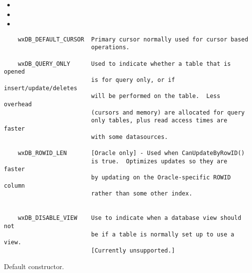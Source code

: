 \begin{itemize}\itemsep=0pt
\item {}
\item {}
\item {}
\end{itemize}


\begin{verbatim}
    wxDB_DEFAULT_CURSOR  Primary cursor normally used for cursor based
                         operations.

    wxDB_QUERY_ONLY      Used to indicate whether a table that is opened
                         is for query only, or if insert/update/deletes
                         will be performed on the table.  Less overhead
                         (cursors and memory) are allocated for query 
                         only tables, plus read access times are faster
                         with some datasources.

    wxDB_ROWID_LEN       [Oracle only] - Used when CanUpdateByRowID()
                         is true.  Optimizes updates so they are faster
                         by updating on the Oracle-specific ROWID column
                         rather than some other index.


    wxDB_DISABLE_VIEW    Use to indicate when a database view should not
                         be if a table is normally set up to use a view.  
                         [Currently unsupported.]

\end{verbatim}



\label{wxdbtableconstr}


Default constructor.


